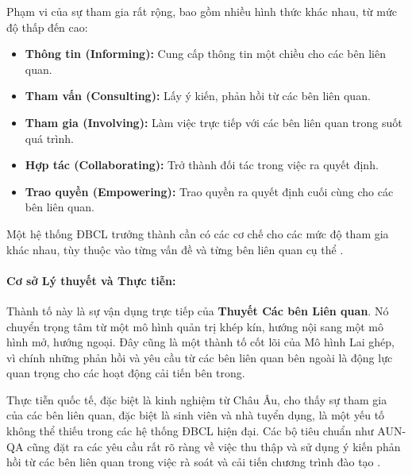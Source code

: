 \documentclass[12pt, a4paper, openany]{report}
\begin{document}
Phạm vi của sự tham gia rất rộng, bao gồm nhiều hình thức khác nhau, từ mức độ thấp đến cao:
\begin{itemize}
    \item \textbf{Thông tin (Informing):} Cung cấp thông tin một chiều cho các bên liên quan.
    \item \textbf{Tham vấn (Consulting):} Lấy ý kiến, phản hồi từ các bên liên quan.
    \item \textbf{Tham gia (Involving):} Làm việc trực tiếp với các bên liên quan trong suốt quá trình.
    \item \textbf{Hợp tác (Collaborating):} Trở thành đối tác trong việc ra quyết định.
    \item \textbf{Trao quyền (Empowering):} Trao quyền ra quyết định cuối cùng cho các bên liên quan.
\end{itemize}
Một hệ thống ĐBCL trưởng thành cần có các cơ chế cho các mức độ tham gia khác nhau, tùy thuộc vào từng vấn đề và từng bên liên quan cụ thể \cite{Arnstein1969}.

\paragraph{Cơ sở Lý thuyết và Thực tiễn:}
Thành tố này là sự vận dụng trực tiếp của \textbf{Thuyết Các bên Liên quan}. Nó chuyển trọng tâm từ một mô hình quản trị khép kín, hướng nội sang một mô hình mở, hướng ngoại. Đây cũng là một thành tố cốt lõi của Mô hình Lai ghép, vì chính những phản hồi và yêu cầu từ các bên liên quan bên ngoài là động lực quan trọng cho các hoạt động cải tiến bên trong.

Thực tiễn quốc tế, đặc biệt là kinh nghiệm từ Châu Âu, cho thấy sự tham gia của các bên liên quan, đặc biệt là sinh viên và nhà tuyển dụng, là một yếu tố không thể thiếu trong các hệ thống ĐBCL hiện đại. Các bộ tiêu chuẩn như AUN-QA cũng đặt ra các yêu cầu rất rõ ràng về việc thu thập và sử dụng ý kiến phản hồi từ các bên liên quan trong việc rà soát và cải tiến chương trình đào tạo \cite{ENQA_Stakeholder2018, AUN-QAGuide}.
\end{document}
